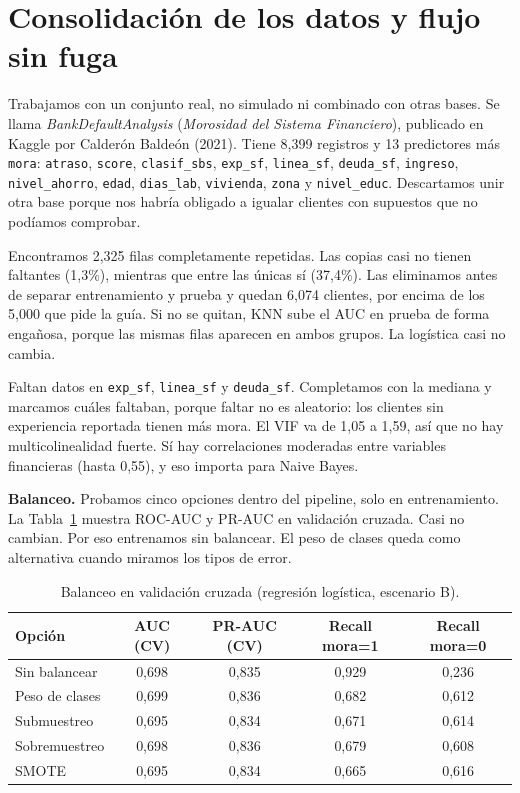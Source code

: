 \documentclass[11pt]{article}
\begin{document}
\section{Consolidación de los datos y flujo sin fuga}

Trabajamos con un conjunto real, no simulado ni combinado con otras bases. Se llama \textit{BankDefaultAnalysis} (\textit{Morosidad del Sistema Financiero}), publicado en Kaggle por Calderón Baldeón (2021). Tiene 8{,}399 registros y 13 predictores más \texttt{mora}: \texttt{atraso}, \texttt{score}, \texttt{clasif\_sbs}, \texttt{exp\_sf}, \texttt{linea\_sf}, \texttt{deuda\_sf}, \texttt{ingreso}, \texttt{nivel\_ahorro}, \texttt{edad}, \texttt{dias\_lab}, \texttt{vivienda}, \texttt{zona} y \texttt{nivel\_educ}. Descartamos unir otra base porque nos habría obligado a igualar clientes con supuestos que no podíamos comprobar.

Encontramos 2{,}325 filas completamente repetidas. Las copias casi no tienen faltantes (1,3\%), mientras que entre las únicas sí (37,4\%). Las eliminamos antes de separar entrenamiento y prueba y quedan 6{,}074 clientes, por encima de los 5{,}000 que pide la guía. Si no se quitan, KNN sube el AUC en prueba de forma engañosa, porque las mismas filas aparecen en ambos grupos. La logística casi no cambia.

Faltan datos en \texttt{exp\_sf}, \texttt{linea\_sf} y \texttt{deuda\_sf}. Completamos con la mediana y marcamos cuáles faltaban, porque faltar no es aleatorio: los clientes sin experiencia reportada tienen más mora. El VIF va de 1,05 a 1,59, así que no hay multicolinealidad fuerte. Sí hay correlaciones moderadas entre variables financieras (hasta 0,55), y eso importa para Naive Bayes.

\textbf{Balanceo.} Probamos cinco opciones dentro del pipeline, solo en entrenamiento. La Tabla~\ref{tab:balanceo} muestra ROC-AUC y PR-AUC en validación cruzada. Casi no cambian. Por eso entrenamos sin balancear. El peso de clases queda como alternativa cuando miramos los tipos de error.

\begin{table}[H]
\centering
\caption{Balanceo en validación cruzada (regresión logística, escenario B).}
\label{tab:balanceo}
\small
\begin{tabular}{@{}lcccc@{}}
\toprule
\textbf{Opción} & \textbf{AUC (CV)} & \textbf{PR-AUC (CV)} & \textbf{Recall mora=1} & \textbf{Recall mora=0} \\
\midrule
Sin balancear & 0,698 & 0,835 & 0,929 & 0,236 \\
Peso de clases & 0,699 & 0,836 & 0,682 & 0,612 \\
Submuestreo & 0,695 & 0,834 & 0,671 & 0,614 \\
Sobremuestreo & 0,698 & 0,836 & 0,679 & 0,608 \\
SMOTE & 0,695 & 0,834 & 0,665 & 0,616 \\
\bottomrule
\end{tabular}
\end{table}
\end{document}
